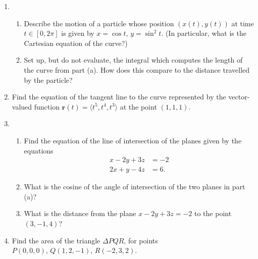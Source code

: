 \documentclass[12pt]{article}
\newcommand{\points}[1]{\marginpar{\hspace{24pt}[#1]}}
\begin{document}
\begin{enumerate}
\item \begin{enumerate}
\item Describe the motion of a particle whose position $(x(t),y(t))$ at time $t\in [0,2\pi]$ is given by $x=\cos t,\, y=\sin^2 t$. (In particular, what is the Cartesian equation of the curve?) \points{6}

\vspace{3in}

\item Set up, but do not evaluate, the integral which computes the length of the curve from part (a). How does this compare to the distance travelled by the particle? \points{4}

\vspace{2.5in}

\end{enumerate}
\item Find the equation of the tangent line to the curve represented by the vector-valued function $\mathbf{r}(t) = \langle t^5,t^4,t^3\rangle$ at the point $(1,1,1)$. \points{4}

\newpage

\item \begin{enumerate}
\item Find the equation of the line of intersection of the planes given by the equations \points{8}
\begin{align*}
x - 2y + 3z & = -2\\
2x + y - 4z & = 6.
\end{align*}


\vspace*{4in}

\item What is the cosine of the angle of intersection of the two planes in part (a)? \points{2}

\vspace{1.5in}

\item What is the distance from the plane $x-2y+3z=-2$ to the point $(3,-1,4)$? \points{3}

\end{enumerate}

\newpage

\item Find the area of the triangle $\Delta PQR$, for points $P(0,0,0),\, Q(1,2,-1),\, R(-2,3,2)$. \points{7}


\end{enumerate}
\end{document}
